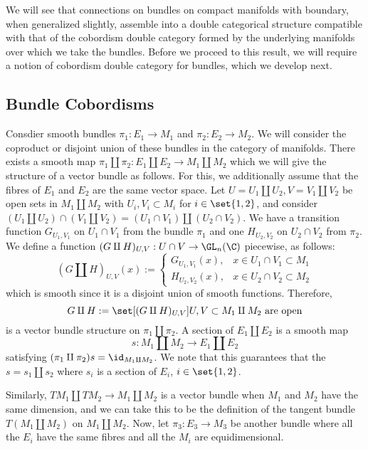 \documentclass[\PRJWD/Thick_TQFTs_and_Quantum_Information.tex]{subfiles}
\begin{document}
We will see that connections on bundles on compact manifolds with boundary, when
generalized slightly, assemble into a double categorical structure compatible
with that of the cobordism double category formed by the underlying manifolds
over which we take the bundles. Before we proceed to this result, we will
require a notion of cobordism double category for bundles, which we develop
next.

\subsection{Bundle Cobordisms}\label{subsec:bund_cob}

Consdier smooth bundles $\pi_1 : E_1 \to M_1$ and $\pi_2 : E_2 \to M_2$. We will
consider the coproduct or disjoint union of these bundles in the category of
manifolds. There exists a smooth map
$\pi_1 \amalg \pi_2 : E_1 \amalg E_2 \to M_1 \amalg M_2$ which we will give the
structure of a vector bundle as follows. For this, we additionally assume that
the fibres of $E_1$ and $E_2$ are the same vector space. Let
$U = U_1 \amalg U_2, V = V_1 \amalg V_2$ be open sets in $M_1 \amalg M_2$ with
$U_i, V_i \subset M_i$ for $i \in \set{1, 2}$, and consider
$(U_1 \amalg U_2) \cap (V_1 \amalg V_2) = (U_1 \cap V_1) \amalg (U_2 \cap V_2)$.
We have a transition function $G_{U_1, V_1}$ on $U_1 \cap V_1$ from the bundle
$\pi_1$ and one $H_{U_2, V_2}$ on $U_2 \cap V_2$ from $\pi_2$. We define a
function $(G \amalg H)_{U, V} : U \cap V \to \GL_n(\C)$ piecewise, as
follows:
\[
  (G \amalg H)_{U, V}(x) := \begin{cases}
    G_{U_1, V_1}(x), & x \in U_1 \cap V_1 \subset M_1 \\
    H_{U_2, V_2}(x), & x \in U_2 \cap V_2 \subset M_2
  \end{cases}
\]
which is smooth since it is a disjoint union of smooth functions. Therefore,
\[
  G \amalg H := \set[(G \amalg H)_{U, V}]
                    {U, V \subset M_1 \amalg M_2 \text{ are open}}
\]
is a vector bundle structure on $\pi_1 \amalg \pi_2$. A section of
$E_1 \amalg E_2$ is a smooth map
\[
  s : M_1 \amalg M_2 \to E_1 \amalg E_2
\]
satisfying $(\pi_1 \amalg \pi_2)s = \id_{M_1 \amalg M_2}$. We note that this
guarantees that the $s = s_1 \amalg s_2$ where $s_i$ is a section of
$E_i$, $i \in \set{1, 2}$.

Similarly, $TM_1 \amalg TM_2 \to M_1 \amalg M_2$ is a vector bundle when $M_1$
and $M_2$ have the same dimension, and we can take this to be the definition of
the tangent bundle $T(M_1 \amalg M_2)$ on $M_1 \amalg M_2$. Now, let
$\pi_3 : E_3 \to M_3$ be another bundle where all the $E_i$ have the same fibres
and all the $M_i$ are equidimensional.
\end{document}
